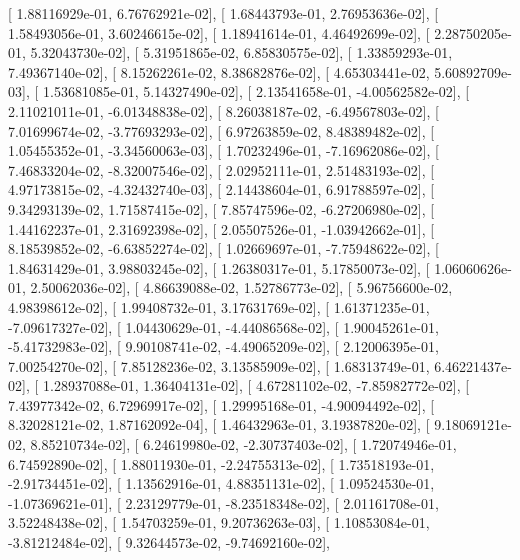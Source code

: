 \documentclass{article}
\begin{document}
       [  1.88116929e-01,   6.76762921e-02],
       [  1.68443793e-01,   2.76953636e-02],
       [  1.58493056e-01,   3.60246615e-02],
       [  1.18941614e-01,   4.46492699e-02],
       [  2.28750205e-01,   5.32043730e-02],
       [  5.31951865e-02,   6.85830575e-02],
       [  1.33859293e-01,   7.49367140e-02],
       [  8.15262261e-02,   8.38682876e-02],
       [  4.65303441e-02,   5.60892709e-03],
       [  1.53681085e-01,   5.14327490e-02],
       [  2.13541658e-01,  -4.00562582e-02],
       [  2.11021011e-01,  -6.01348838e-02],
       [  8.26038187e-02,  -6.49567803e-02],
       [  7.01699674e-02,  -3.77693293e-02],
       [  6.97263859e-02,   8.48389482e-02],
       [  1.05455352e-01,  -3.34560063e-03],
       [  1.70232496e-01,  -7.16962086e-02],
       [  7.46833204e-02,  -8.32007546e-02],
       [  2.02952111e-01,   2.51483193e-02],
       [  4.97173815e-02,  -4.32432740e-03],
       [  2.14438604e-01,   6.91788597e-02],
       [  9.34293139e-02,   1.71587415e-02],
       [  7.85747596e-02,  -6.27206980e-02],
       [  1.44162237e-01,   2.31692398e-02],
       [  2.05507526e-01,  -1.03942662e-01],
       [  8.18539852e-02,  -6.63852274e-02],
       [  1.02669697e-01,  -7.75948622e-02],
       [  1.84631429e-01,   3.98803245e-02],
       [  1.26380317e-01,   5.17850073e-02],
       [  1.06060626e-01,   2.50062036e-02],
       [  4.86639088e-02,   1.52786773e-02],
       [  5.96756600e-02,   4.98398612e-02],
       [  1.99408732e-01,   3.17631769e-02],
       [  1.61371235e-01,  -7.09617327e-02],
       [  1.04430629e-01,  -4.44086568e-02],
       [  1.90045261e-01,  -5.41732983e-02],
       [  9.90108741e-02,  -4.49065209e-02],
       [  2.12006395e-01,   7.00254270e-02],
       [  7.85128236e-02,   3.13585909e-02],
       [  1.68313749e-01,   6.46221437e-02],
       [  1.28937088e-01,   1.36404131e-02],
       [  4.67281102e-02,  -7.85982772e-02],
       [  7.43977342e-02,   6.72969917e-02],
       [  1.29995168e-01,  -4.90094492e-02],
       [  8.32028121e-02,   1.87162092e-04],
       [  1.46432963e-01,   3.19387820e-02],
       [  9.18069121e-02,   8.85210734e-02],
       [  6.24619980e-02,  -2.30737403e-02],
       [  1.72074946e-01,   6.74592890e-02],
       [  1.88011930e-01,  -2.24755313e-02],
       [  1.73518193e-01,  -2.91734451e-02],
       [  1.13562916e-01,   4.88351131e-02],
       [  1.09524530e-01,  -1.07369621e-01],
       [  2.23129779e-01,  -8.23518348e-02],
       [  2.01161708e-01,   3.52248438e-02],
       [  1.54703259e-01,   9.20736263e-03],
       [  1.10853084e-01,  -3.81212484e-02],
       [  9.32644573e-02,  -9.74692160e-02],
\end{document}
